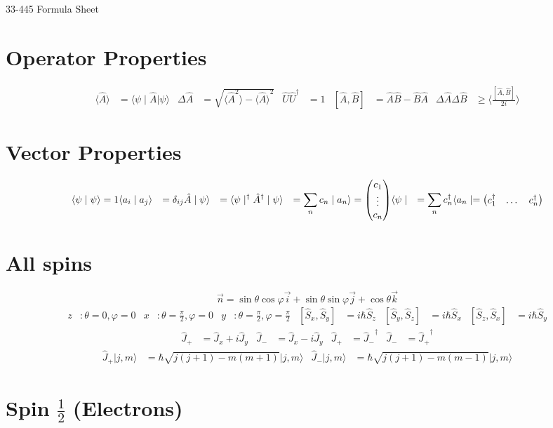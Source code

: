 \documentclass{article}
\newcommand{\mysection}[1]{\vspace{-2em}
\section*{#1}
\vspace{-2em}}
\newcommand{\bra}[1]{\ensuremath{\langle#1\mid}}
\newcommand{\ket}[1]{\ensuremath{\mid#1\rangle}}
\newcommand{\braket}[2]{\ensuremath{\langle#1\mid#2\rangle}}
\newcommand{\expect}[1]{\ensuremath{\langle#1\rangle}}
\newcommand{\op}[1]{\ensuremath{\hat#1}}
\newcommand{\opt}[1]{\tp{\op{#1}}}
\newcommand{\tp}[1]{\ensuremath{#1^\dagger}}
\newcommand{\mat}[1]{\ensuremath{\begin{pmatrix}\ensuremath{#1}\end{pmatrix}}}
\begin{document}
	\begin{center}
		{\LARGE{33-445 Formula Sheet}}
	\end{center}
	\mysection{Operator Properties}
	\begin{align*}
		\expect{\op{A}}&=\bra{\psi}\op{A}\ket{\psi} &
		\Delta\op{A}&=\sqrt{\expect{\op{A}^2}-\expect{\op{A}}^2} &
		\op{U}\opt{U}&=1 & 
		[\op{A},\op{B}]&=\op{A}\op{B}-\op{B}\op{A} &
		\Delta\op{A}\Delta\op{B}&\ge\expect{\frac{[\op{A},\op{B}]}{2i}}
	\end{align*}
	\mysection{Vector Properties}
	\begin{align*}
		\braket{\psi}{\psi}=1 &
		\braket{a_i}{a_j}&=\delta_{ij} &
		\op{A}\ket{\psi}&=\tp{\bra{\psi}}\opt{A} &
		\ket{\psi}&=\sum\limits_nc_n\ket{a_n}=\mat{c_1\\\vdots\\c_n} &
		\bra{\psi}&=\sum\limits_n\tp{c_n}\bra{a_n}=\mat{\tp{c_1}&\dots&\tp{c_n}}
	\end{align*}
	\mysection{All spins}
	\[\vec{n}=\sin\theta\cos\varphi\vec{i}+\sin\theta\sin\varphi\vec{j}+
		\cos\theta\vec{k}\]
	\begin{align*}
		z&:\theta=0,\varphi=0 & 
		x&:\theta=\frac{\pi}{2},\varphi=0 &
		y&:\theta=\frac{\pi}{2},\varphi=\frac{\pi}{2} &
		[\op{S_x},\op{S_y}]&=i\hbar\op{S_z} &
		[\op{S_y},\op{S_z}]&=i\hbar\op{S_x} &
		[\op{S_z},\op{S_x}]&=i\hbar\op{S_y}
	\end{align*}
	\vspace{-2em}
	\begin{align*}
		\op{J_+}&=\op{J_x}+i\op{J_y} &
		\op{J_-}&=\op{J_x}-i\op{J_y} &
		\op{J_+}&=\opt{J_-} &
		\op{J_-}&=\opt{J_+}
	\end{align*}
	\vspace{-2em}
	\begin{align*}
		\op{J_+}\ket{j,m}&=\hbar\sqrt{j(j+1)-m(m+1)}\ket{j,m} &
		\op{J_-}\ket{j,m}&=\hbar\sqrt{j(j+1)-m(m-1)}\ket{j,m}
	\end{align*}
	\mysection{Spin $\frac{1}{2}$ (Electrons)}
\end{document}
